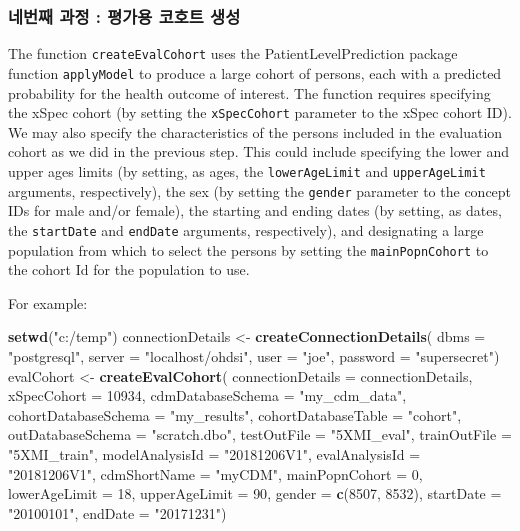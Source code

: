 \documentclass[11pt]{book}
\newenvironment{Shaded}{\begin{snugshade}}{\end{snugshade}}
\newcommand{\KeywordTok}[1]{\textcolor[rgb]{0.13,0.29,0.53}{\textbf{#1}}}
\newcommand{\DataTypeTok}[1]{\textcolor[rgb]{0.13,0.29,0.53}{#1}}
\newcommand{\DecValTok}[1]{\textcolor[rgb]{0.00,0.00,0.81}{#1}}
\newcommand{\StringTok}[1]{\textcolor[rgb]{0.31,0.60,0.02}{#1}}
\newcommand{\NormalTok}[1]{#1}
\theoremstyle{definition}
\theoremstyle{definition}
\theoremstyle{definition}
\theoremstyle{remark}
\begin{document}
\subsubsection*{네번째 과정 : 평가용 코호트 생성}\label{----}

The function \texttt{createEvalCohort} uses the PatientLevelPrediction
package function \texttt{applyModel} to produce a large cohort of
persons, each with a predicted probability for the health outcome of
interest. The function requires specifying the xSpec cohort (by setting
the \texttt{xSpecCohort} parameter to the xSpec cohort ID). We may also
specify the characteristics of the persons included in the evaluation
cohort as we did in the previous step. This could include specifying the
lower and upper ages limits (by setting, as ages, the
\texttt{lowerAgeLimit} and \texttt{upperAgeLimit} arguments,
respectively), the sex (by setting the \texttt{gender} parameter to the
concept IDs for male and/or female), the starting and ending dates (by
setting, as dates, the \texttt{startDate} and \texttt{endDate}
arguments, respectively), and designating a large population from which
to select the persons by setting the \texttt{mainPopnCohort} to the
cohort Id for the population to use.

For example:

\begin{Shaded}
\begin{Highlighting}[]
\KeywordTok{setwd}\NormalTok{(}\StringTok{"c:/temp"}\NormalTok{)}
\NormalTok{connectionDetails <-}\StringTok{ }\KeywordTok{createConnectionDetails}\NormalTok{(}
  \DataTypeTok{dbms =} \StringTok{"postgresql"}\NormalTok{,}
  \DataTypeTok{server =} \StringTok{"localhost/ohdsi"}\NormalTok{,}
  \DataTypeTok{user =} \StringTok{"joe"}\NormalTok{,}
  \DataTypeTok{password =} \StringTok{"supersecret"}\NormalTok{)}
\NormalTok{evalCohort <-}\StringTok{ }\KeywordTok{createEvalCohort}\NormalTok{(}
  \DataTypeTok{connectionDetails =}\NormalTok{ connectionDetails,}
  \DataTypeTok{xSpecCohort =} \DecValTok{10934}\NormalTok{,}
  \DataTypeTok{cdmDatabaseSchema =} \StringTok{"my_cdm_data"}\NormalTok{,}
  \DataTypeTok{cohortDatabaseSchema =} \StringTok{"my_results"}\NormalTok{,}
  \DataTypeTok{cohortDatabaseTable =} \StringTok{"cohort"}\NormalTok{,}
  \DataTypeTok{outDatabaseSchema =} \StringTok{"scratch.dbo"}\NormalTok{,}
  \DataTypeTok{testOutFile =} \StringTok{"5XMI_eval"}\NormalTok{,}
  \DataTypeTok{trainOutFile =} \StringTok{"5XMI_train"}\NormalTok{,}
  \DataTypeTok{modelAnalysisId =} \StringTok{"20181206V1"}\NormalTok{,}
  \DataTypeTok{evalAnalysisId =} \StringTok{"20181206V1"}\NormalTok{,}
  \DataTypeTok{cdmShortName =} \StringTok{"myCDM"}\NormalTok{,}
  \DataTypeTok{mainPopnCohort =} \DecValTok{0}\NormalTok{,}
  \DataTypeTok{lowerAgeLimit =} \DecValTok{18}\NormalTok{,}
  \DataTypeTok{upperAgeLimit =} \DecValTok{90}\NormalTok{,}
  \DataTypeTok{gender =} \KeywordTok{c}\NormalTok{(}\DecValTok{8507}\NormalTok{, }\DecValTok{8532}\NormalTok{),}
  \DataTypeTok{startDate =} \StringTok{"20100101"}\NormalTok{,}
  \DataTypeTok{endDate =} \StringTok{"20171231"}\NormalTok{)}
\end{Highlighting}
\end{Shaded}
\end{document}
